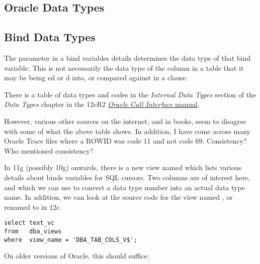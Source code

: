\begin{appendix}

\chapter{Oracle Data Types}\label{oracle-data-types}

\section*{Bind Data Types}\label{bind-data-types}

The  parameter in a bind variables details determines
the data type of that bind variable. This is not necessarily the data
type of the column in a table that it may be being ed
or d into, or compared against in a  clause.

There is a table of data types and codes in the \emph{Internal Data Types} section of the \emph{Data Types} chapter in the 12cR2 \href{http://docs.oracle.com/database/122/LNOCI/data-types.htm\#LNOCI16266}{\emph{Oracle Call Interface} manual}.

However, various other sources on the internet, and in books, seem to
disagree with some of what the above table shows. In addition, I have
come across many Oracle Trace files where a ROWID was code 11 and not
code 69. Consistency? Who mentioned consistency?

In 11g (possibly 10g) onwards, there is a new view named  which lists various details about binds variables for SQL cursors. Two columns are of interest here,  and  which we can use to convert a data type number into an actual data type name. In addition, we can look at the source code for the view named , or renamed to  in 12c.

\begin{lstlisting}[numbers=none,caption={Extracting the source code for DBA\_TAB\_COLS\_V\$ in Oracle 12.2.0.2}]
select text_vc
from   dba_views
where  view_name = 'DBA_TAB_COLS_V$';
\end{lstlisting}  

On older versions of Oracle, this should suffice:


\end{appendix}
